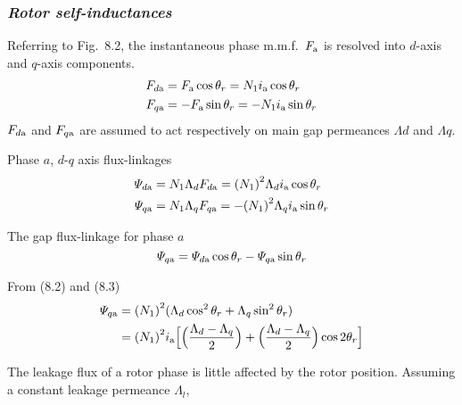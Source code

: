 \documentclass[a4paper,numbers=noenddot,12pt]{scrbook}
\begin{document}
    \subsubsection{\textit{Rotor self-inductances}}
    Referring to Fig.\ 8.2, the instantaneous phase m.m.f.\ $F_{\textup{a}}$ is resolved into $d$-axis and $q$-axis components.
    \begin{equation}
        \begin{aligned}
            F_{d\textup{a}} & = F_{\textup{a}} \cos \theta_r = N_1 i_{\textup{a}} \cos \theta_r \\
            F_{q\textup{a}} & = - F_{\textup{a}} \sin \theta_r = - N_1 i_{\textup{a}} \sin \theta_r
        \end{aligned}
        \label{eq:Eq8.1}
    \end{equation}
    $F_{d\textup{a}}$ and $F_{q\textup{a}}$ are assumed to act respectively on main gap permeances $\Lambda d$ and $\Lambda q$.

    Phase $a$, $d$-$q$ axis flux-linkages
    \begin{equation}
        \begin{aligned}
            \varPsi_{d\textup{a}} & = N_1 \Lambda_d F_{d\textup{a}} = {(N_1)}^2 \Lambda_d i_{\textup{a}} \cos \theta_r \\
            \varPsi_{q\textup{a}} & = N_1 \Lambda_q F_{q\textup{a}} = - {(N_1)}^2 \Lambda_q i_{\textup{a}} \sin \theta_r 
        \end{aligned}
        \label{eq:Eq8.2}
    \end{equation}

    The gap flux-linkage for phase $a$
    \begin{equation}
        \varPsi_{q\textup{a}} = \varPsi_{d\textup{a}} \cos \theta_r - \varPsi_{q\textup{a}} \sin \theta_r
        \label{eq:Eq8.3}
    \end{equation}

    From (8.2) and (8.3)
    \begin{align}
        \varPsi_{q\textup{a}} & = {(N_1)}^2(\Lambda_d \cos^2 \theta_r + \Lambda_q \sin^2 \theta_r) \nonumber \\
        & = {(N_1)}^2 i_{\textup{a}} \Big[ \Big(\dfrac{\Lambda_d -\Lambda_q}{2}\Big) + \Big( \dfrac{\Lambda_d - \Lambda_q}{2} \Big) \cos 2\theta_r \Big]
        \label{eq:Eq8.4}
    \end{align}

    The leakage flux of a rotor phase is little affected by the rotor position. Assuming a constant leakage permeance $\Lambda_l$,
\end{document}
